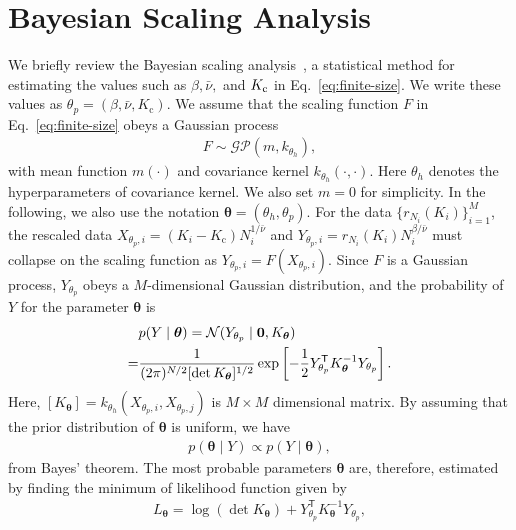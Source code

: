 \section{Bayesian Scaling Analysis}
\label{sec:bsa}
We briefly review the Bayesian scaling analysis~\cite{harada2011,harada2015},
 a statistical method for estimating the values such as $\beta, \bar{\nu},$ and $K_{\rm c}$ in Eq.~\eqref{eq:finite-size}.
We write these values as $\theta_{p}=(\beta,\bar{\nu},K_{\mathrm{c}})$.
We assume that the scaling function $F$ in Eq.~\eqref{eq:finite-size} obeys a Gaussian process
\begin{align}
    F\sim\mathcal{GP}(m,k_{\theta_{h}}),
\end{align}
with mean function $m(\cdot)$ and covariance kernel $k_{\theta_{h}}(\cdot,\cdot)$.
Here $\theta_{h}$ denotes the hyperparameters of covariance kernel.
We also set $m=0$ for simplicity.
In the following, we also use the notation $\bm{\theta}=(\theta_{h},\theta_{p})$.
For the data $\{r_{N_{i}}(K_{i})\}_{i=1}^{M}$,
the rescaled data $X_{\theta_{p},i}=(K_{i}-K_{\mathrm{c}})N_{i}^{1/\bar{\nu}}$
and $Y_{\theta_{p},i}=r_{N_{i}}(K_{i})N_{i}^{\beta/\bar{\nu}}$
must collapse on the scaling function as $Y_{\theta_{p},i}=F(X_{\theta_{p},i})$.
Since $F$ is a Gaussian process, $Y_{\theta_{p}}$ obeys a $M$-dimensional
Gaussian distribution, and the probability of $Y$ for the parameter $\bm{\theta}$ is
\begin{align}
    &p(Y\mid\bm{\theta})=\mathcal{N}(Y_{\theta_{p}}\mid\bm{0},K_{\bm{\theta}})\notag\\
    =&\frac{1}{(2\pi)^{N/2}[\det K_{\bm{\theta}}]^{1/2}}
    \exp\left[-\frac{1}{2}Y_{\theta_{p}}^{\mathsf{T}}K_{\bm{\theta}}^{-1}Y_{\theta_{p}}\right].
    \label{eq:posterior}
\end{align}
Here, $[K_{\bm{\theta}}]=k_{\theta_{h}}(X_{\theta_{p},i},X_{\theta_{p},j})$ is $M\times M$ dimensional matrix.
By assuming that the prior distribution of $\bm{\theta}$ is uniform, we have
\begin{align}
    p(\bm{\theta}\mid Y)\propto p(Y\mid\bm{\theta}),
\end{align}
from Bayes' theorem.
The most probable parameters $\bm{\theta}$ are, therefore,  estimated by finding the minimum of likelihood function given by
\begin{align}
  L_{\bm{\theta}}
  = \log(\det K_{\bm{\theta}})
  + Y_{\theta_{p}}^{\mathsf{T}}K_{\bm{\theta}}^{-1}Y_{\theta_{p}},
    \label{eq:likelihood}
\end{align}
